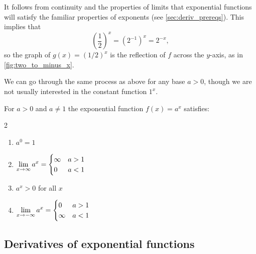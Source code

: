 It follows from continuity and the properties of limits that exponential functions will satisfy the familiar properties of exponents (see \autoref{sec:deriv_prereqs}).
This implies that
\[\left(\frac12\right)^x =(2^{-1})^x=2^{-x},\]
so the graph of $g(x)=(1/2)^x$ is the reflection of $f$ across the $y$-axis, as in \autoref{fig:two_to_minus_x}.

We can go through the same process as above for any base $a>0$, though we are not usually interested in the constant function $1^x$.

\begin{keyidea}\label{ki_exp_func_props}%
For $a>0$ and $a\neq1$ the exponential function $f(x)=a^x$ satisfies:
\begin{multicols}{2}
\begin{enumerate}
 \item $a^0=1$
 \item $\displaystyle\lim_{x\to\infty}a^x=\begin{cases}\infty&a>1\\0&a<1\end{cases}$
 \item $a^x>0$ for all $x$
 \item $\displaystyle\lim_{x\to-\infty}a^x=\begin{cases}0&a>1\\\infty&a<1\end{cases}$
\end{enumerate}
\end{multicols}
\end{keyidea}

\subsection{Derivatives of exponential functions}


